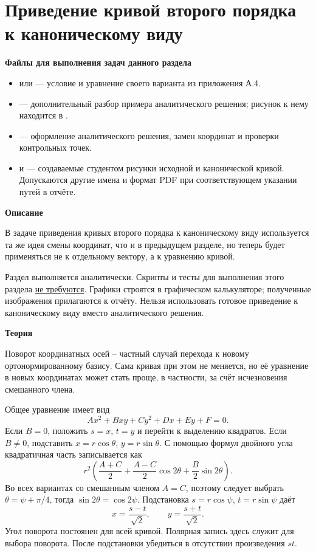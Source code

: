 \documentclass[12pt,a4paper]{article}
\newcommand{\taskhead}[1]{\par\textbf{#1}\par}
\begin{document}
\newpage

\section{Приведение кривой второго порядка к каноническому виду}
\taskhead{Файлы для выполнения задач данного раздела}
\begin{itemize}
\item {} или  --- условие и уравнение своего варианта из приложения А.4.
\item {} --- дополнительный разбор примера аналитического решения; рисунок к нему находится в .
\item {} --- оформление аналитического решения, замен координат и проверки контрольных точек.
\item {} и  --- создаваемые студентом рисунки исходной и канонической кривой. Допускаются другие имена и формат PDF при соответствующем указании путей в отчёте.
\end{itemize}

\taskhead{Описание}

{В задаче приведения кривых второго порядка к каноническому виду используется та же идея смены координат, 
что и в предыдущем разделе, но теперь будет применяться не к отдельному вектору, а к уравнению кривой.}

Раздел выполняется аналитически. Скрипты и тесты для выполнения этого раздела \underline{не требуются}.
Графики строятся в графическом калькуляторе; полученные
изображения прилагаются к отчёту. Нельзя использовать готовое приведение к каноническому виду
вместо аналитического решения.

\taskhead{Теория}

Поворот координатных осей – частный случай перехода к новому ортонормированному базису. 
Сама кривая при этом не меняется, но её уравнение в новых координатах может стать проще, в частности, за счёт исчезновения смешанного члена.

Общее уравнение имеет вид
\[
Ax^2+Bxy+Cy^2+Dx+Ey+F=0.
\]
Если $B=0$, положить $s=x$, $t=y$ и перейти к выделению квадратов.
Если $B\ne0$, подставить $x=r\cos\theta$, $y=r\sin\theta$.
С помощью формул двойного угла квадратичная часть записывается как
\[
r^2\left(\frac{A+C}{2}+\frac{A-C}{2}\cos2\theta
+\frac B2\sin2\theta\right).
\]
Во всех вариантах со смешанным членом $A=C$, поэтому следует выбрать
$\theta=\psi+\pi/4$, тогда $\sin2\theta=\cos2\psi$.
Подстановка $s=r\cos\psi$, $t=r\sin\psi$ даёт
\[
x=\frac{s-t}{\sqrt2},\qquad y=\frac{s+t}{\sqrt2}.
\]
Угол поворота постоянен для всей кривой. Полярная запись здесь служит
для выбора поворота.
После подстановки убедиться в отсутствии произведения $st$.
\end{document}
